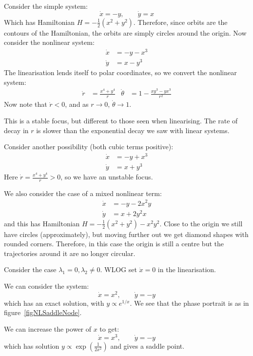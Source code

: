 \documentclass[../Main.tex]{subfiles}
\begin{document}
\begin{example}
    Consider the simple system:
    \begin{equation*}
        \dot{x} = -y,\qquad\dot{y} = x
    \end{equation*}
    Which has Hamiltonian $H = -\frac12(x^2 + y^2)$. Therefore, since orbits are the contours of the Hamiltonian, the orbits are simply circles around the origin. Now consider the nonlinear system:
    \begin{align*}
        \dot{x} &= -y -x^3 \\
        \dot{y} &= x - y^3
    \end{align*}
    The linearisation lends itself to polar coordinates, so we convert the nonlinear system:
    \begin{align*}
        \dot{r} &= \frac{x^4 + y^4}{r} & \dot{\theta} &= 1 - \frac{xy^3 - yx^3}{r^2}
    \end{align*}
    Now note that $\dot{r} < 0$, and as $r \to 0$, $\dot{\theta} \to 1$.

    This is a stable focus, but different to those seen when linearising. The rate of decay in $r$ is slower than the exponential decay we saw with linear systems.

    Consider another possibility (both cubic terms positive):
    \begin{align*}
        \dot{x} &= -y + x^3 \\
        \dot{y} &= x + y^3
    \end{align*}
    Here $\dot{r} = \frac{x^4 + y^4}{r} > 0$, so we have an unstable focus.

    We also consider the case of a mixed nonlinear term:
    \begin{align*}
        \dot{x} &= -y - 2x^2 y \\
        \dot{y} &= x + 2y^2 x
    \end{align*}
    and this has Hamiltonian $H = -\frac12 \left(x^2 + y^2\right) - x^2 y^2$. Close to the origin we still have circles (approximately), but moving further out we get diamond shapes with rounded corners. Therefore, in this case the origin is still a centre but the trajectories around it are no longer circular.
\end{example}
\begin{example}
    Consider the case $\lambda_1 = 0, \lambda_2 \neq 0$. WLOG set $\dot{x} = 0$ in the linearisation.

    We can consider the system:
    \begin{equation*}
        \dot{x} = x^2,\qquad \dot{y} = -y
    \end{equation*}
    which has an exact solution, with $y \propto e^{1 / x}$. We see that the phase portrait is as in figure~\ref{figNLSaddleNode}.

    We can increase the power of $x$ to get:
    \begin{equation*}
        \dot{x} = x^3,\qquad \dot{y} = -y
    \end{equation*}   
    which has solution $y\propto \exp\left(\frac{1}{2x^2}\right)$ and gives a saddle point.
\end{example}
\end{document}
